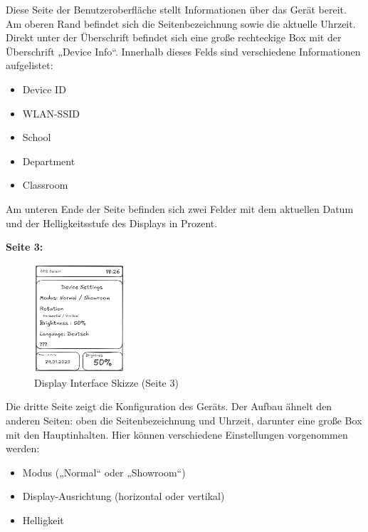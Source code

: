 \begin{inhalt}
Diese Seite der Benutzeroberfläche stellt Informationen über das Gerät bereit. Am oberen Rand befindet sich die Seitenbezeichnung sowie die aktuelle Uhrzeit. Direkt unter der Überschrift befindet sich eine große rechteckige Box mit der Überschrift „Device Info“. Innerhalb dieses Felds sind verschiedene Informationen aufgelistet:
\begin{itemize}
    \item Device ID
    \item WLAN-SSID
    \item School
    \item Department
    \item Classroom
\end{itemize}

Am unteren Ende der Seite befinden sich zwei Felder mit dem aktuellen Datum und der Helligkeitsstufe des Displays in Prozent.

\clearpage

\begin{center}
    \textbf{Seite 3:}
\end{center}

\begin{figure}[!htb]
\centering
\includegraphics[width=0.3\textwidth]{files/Tobias/pics/Skizzen/Screen3_Settings.png}
\caption[Display Interface Skizze (Seite 3)]{Display Interface Skizze (Seite 3)}
\label{fig:display_skizze_seite_3}
\end{figure}

Die dritte Seite zeigt die Konfiguration des Geräts. Der Aufbau ähnelt den anderen Seiten: oben die Seitenbezeichnung und Uhrzeit, darunter eine große Box mit den Hauptinhalten. Hier können verschiedene Einstellungen vorgenommen werden:

\begin{itemize}
    \item Modus („Normal“ oder „Showroom“)
    \item Display-Ausrichtung (horizontal oder vertikal)
    \item Helligkeit
\end{itemize}


\end{inhalt}
